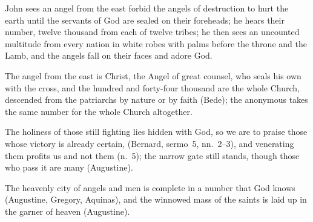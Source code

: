 \begin{fourSenses}
\item[Literal.] John sees an angel from the east forbid the angels of
destruction to hurt the earth until the servants of God are sealed on their
foreheads; he hears their number, twelve thousand from each of twelve tribes;
he then sees an uncounted multitude from every nation in white robes with
palms before the throne and the Lamb, and the angels fall on their faces and
adore God.
\item[Allegorical.] The angel from the east is Christ, the Angel of great
counsel, who seals his own with the cross, and the hundred and forty-four
thousand are the whole Church, descended from the patriarchs by nature or by
faith (Bede); the anonymous  takes the same number for the
whole Church altogether.
\item[Moral.] The holiness of those still fighting lies hidden with God, so
we are to praise those whose victory is already certain,  (Bernard, sermo~5, nn.~2--3), and venerating them profits
us and not them (n.~5); the narrow gate still stands, though those who pass it
are many (Augustine).
\item[Anagogical.] The heavenly city of angels and men is complete in a number
that God knows (Augustine, Gregory, Aquinas), and the winnowed mass of the
saints is laid up in the garner of heaven (Augustine).
\end{fourSenses}
